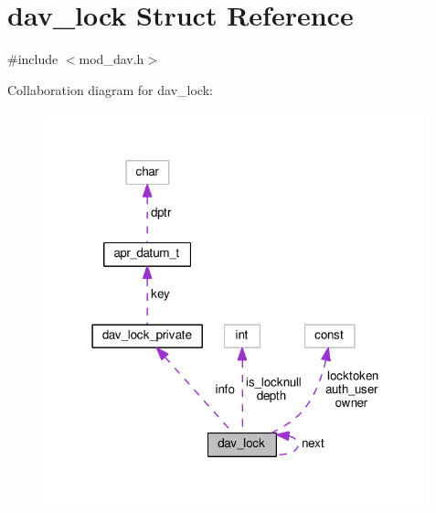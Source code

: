 \hypertarget{structdav__lock}{}\section{dav\+\_\+lock Struct Reference}
\label{structdav__lock}


{\ttfamily \#include $<$mod\+\_\+dav.\+h$>$}



Collaboration diagram for dav\+\_\+lock\+:
\nopagebreak
\begin{figure}[H]
\begin{center}
\leavevmode
\includegraphics[width=316pt]{structdav__lock__coll__graph}
\end{center}
\end{figure}
